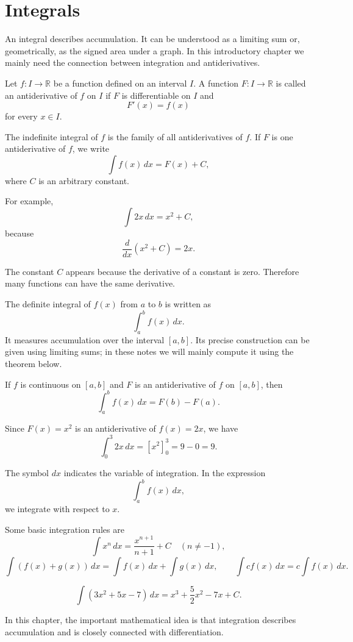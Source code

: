 \section{Integrals}

An integral describes accumulation. It can be understood as a limiting sum or, geometrically, as the signed area under a graph. In this introductory chapter we mainly need the connection between integration and antiderivatives.

\begin{definitionbox}
Let \(f\colon I\to\mathbb{R}\) be a function defined on an interval \(I\). A function \(F\colon I\to\mathbb{R}\) is called an antiderivative of \(f\) on \(I\) if \(F\) is differentiable on \(I\) and
\[
F'(x)=f(x)
\]
for every \(x\in I\).
\end{definitionbox}

\begin{definitionbox}
The indefinite integral of \(f\) is the family of all antiderivatives of \(f\). If \(F\) is one antiderivative of \(f\), we write
\[
\int f(x)\,dx=F(x)+C,
\]
where \(C\) is an arbitrary constant.
\end{definitionbox}

For example,
\[
\int 2x\,dx=x^2+C,
\]
because
\[
\frac{d}{dx}(x^2+C)=2x.
\]

\begin{remarkbox}
The constant \(C\) appears because the derivative of a constant is zero. Therefore many functions can have the same derivative.
\end{remarkbox}

The definite integral of \(f(x)\) from \(a\) to \(b\) is written as
\[
\int_a^b f(x)\,dx.
\]
It measures accumulation over the interval \([a,b]\). Its precise construction can be given using limiting sums; in these notes we will mainly compute it using the theorem below.

\begin{theorembox}
If \(f\) is continuous on \([a,b]\) and \(F\) is an antiderivative of \(f\) on \([a,b]\), then
\[
\int_a^b f(x)\,dx=F(b)-F(a).
\]
\end{theorembox}

\begin{examplebox}
Since \(F(x)=x^2\) is an antiderivative of \(f(x)=2x\), we have
\[
\int_0^3 2x\,dx
=
\left[x^2\right]_0^3
=
9-0
=
9.
\]
\end{examplebox}

The symbol \(dx\) indicates the variable of integration. In the expression
\[
\int_a^b f(x)\,dx,
\]
we integrate with respect to \(x\).

Some basic integration rules are
\[
\int x^n\,dx=\frac{x^{n+1}}{n+1}+C \quad (n\neq -1),
\]
\[
\int (f(x)+g(x))\,dx=\int f(x)\,dx+\int g(x)\,dx,
\qquad
\int c f(x)\,dx=c\int f(x)\,dx.
\]

\begin{examplebox}
\[
\int (3x^2+5x-7)\,dx
=
x^3+\frac{5}{2}x^2-7x+C.
\]
\end{examplebox}

In this chapter, the important mathematical idea is that integration describes accumulation and is closely connected with differentiation.
